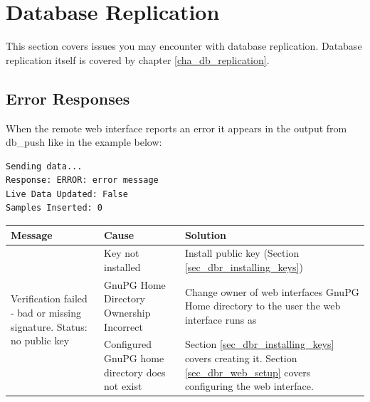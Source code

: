 \documentclass[a4paper,10pt,draft]{book}
\newcommand{\partnumber}{\ifthenelse{\isundefined{\projectnum}}{}{\projectnum-\docnum	\ifthenelse{\equal{\docrev}{001}}{}{.\docrev}}}
\begin{document}
\section{Database Replication}

This section covers issues you may encounter with database replication. Database replication itself is covered by chapter \ref{cha_db_replication}.

\subsection{Error Responses}
When the remote web interface reports an error it appears in the output from db\_push like in the example below:
\begin{verbatim}
Sending data...
Response: ERROR: error message
Live Data Updated: False
Samples Inserted: 0
\end{verbatim}

\begin{tabular}{p{4.5cm} p{4.5cm} p{4.5cm}}
\hline
\textbf{Message} & \textbf{Cause} & \textbf{Solution} \\
\hline
\multirow{6}{*}{\parbox{4.5cm}{Verification failed - bad or missing signature. Status: no public key}} & Key not installed & Install public key (Section \ref{sec_dbr_installing_keys}) \\[0.2cm]
 & GnuPG Home Directory Ownership Incorrect & Change owner of web interfaces GnuPG Home directory to the user the web interface runs as \\[0.2cm]
 & Configured GnuPG home directory does not exist & Section \ref{sec_dbr_installing_keys} covers creating it. Section \ref{sec_dbr_web_setup} covers configuring the web interface. \\
\hline
\end{tabular}


% 


\newpage
\thispagestyle{empty}
\begin{flushright}
\null
\vfill
\tt \partnumber
\end{flushright}
\end{document}
